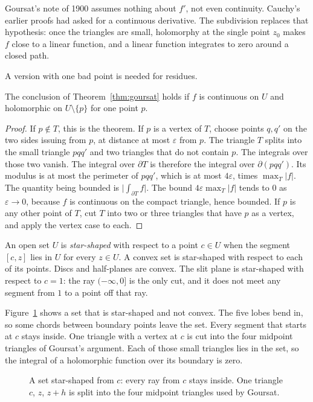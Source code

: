 Goursat's note of 1900 assumes nothing about $f'$, not even continuity. Cauchy's earlier proofs had asked for a continuous derivative. The subdivision replaces that hypothesis: once the triangles are small, holomorphy at the single point $z_0$ makes $f$ close to a linear function, and a linear function integrates to zero around a closed path.

A version with one bad point is needed for residues.

\begin{corollary}\label{cor:goursatpoint}
The conclusion of Theorem~\ref{thm:goursat} holds if $f$ is continuous on $U$ and holomorphic on $U\setminus\{p\}$ for one point $p$.
\end{corollary}
\begin{proof}
If $p\notin T$, this is the theorem. If $p$ is a vertex of $T$, choose points $q,q'$ on the two sides issuing from $p$, at distance at most $\varepsilon$ from $p$. The triangle $T$ splits into the small triangle $pqq'$ and two triangles that do not contain $p$. The integrals over those two vanish. The integral over $\partial T$ is therefore the integral over $\partial(pqq')$. Its modulus is at most the perimeter of $pqq'$, which is at most $4\varepsilon$, times $\max_T|f|$. The quantity being bounded is $\bigl|\int_{\partial T}f\bigr|$. The bound $4\varepsilon\max_T|f|$ tends to $0$ as $\varepsilon\to0$, because $f$ is continuous on the compact triangle, hence bounded. If $p$ is any other point of $T$, cut $T$ into two or three triangles that have $p$ as a vertex, and apply the vertex case to each.
\end{proof}

An open set $U$ is \emph{star-shaped} with respect to a point $c\in U$ when the segment $[c,z]$ lies in $U$ for every $z\in U$. A convex set is star-shaped with respect to each of its points. Discs and half-planes are convex. The slit plane is star-shaped with respect to $c=1$: the ray $(-\infty,0]$ is the only cut, and it does not meet any segment from $1$ to a point off that ray.

Figure~\ref{fig:rw09-star} shows a set that is star-shaped and not convex. The five lobes bend in, so some chords between boundary points leave the set. Every segment that starts at $c$ stays inside. One triangle with a vertex at $c$ is cut into the four midpoint triangles of Goursat's argument. Each of those small triangles lies in the set, so the integral of a holomorphic function over its boundary is zero.

\begin{figure}[ht]
\centering
{}
\caption{A set star-shaped from $c$: every ray from $c$ stays inside. One triangle $c$, $z$, $z{+}h$ is split into the four midpoint triangles used by Goursat.}
\label{fig:rw09-star}
\end{figure}

